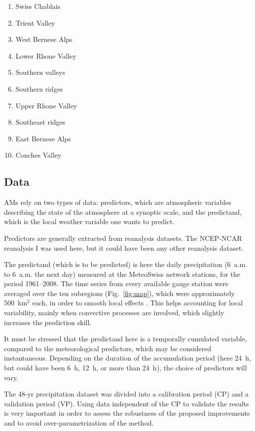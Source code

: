 \documentclass[review]{elsarticle}
\begin{document}
\begin{enumerate}
	\item Swiss Chablais
	\item Trient Valley
	\item West Bernese Alps
	\item Lower Rhone Valley
	\item Southern valleys
	\item Southern ridges
	\item Upper Rhone Valley
	\item Southeast ridges
	\item East Bernese Alps
	\item Conches Valley
\end{enumerate}


\subsection{Data}
\label{sec:data}

AMs rely on two types of data: predictors, which are atmospheric variables describing the state of the atmosphere at a synoptic scale, and the predictand, which is the local weather variable one wants to predict.

Predictors are generally extracted from reanalysis datasets. The NCEP-NCAR reanalysis I \citep[6-hourly, 17 pressure levels at a resolution of 2.5\degree, see][]{Kalnay1996} was used here, but it could have been any other reanalysis dataset.

The predictand (which is to be predicted) is here the daily precipitation (6~a.m. to 6~a.m. the next day) measured at the MeteoSwiss network stations, for the period 1961--2008. The time series from every available gauge station were averaged over the ten subregions (Fig.\ \ref{fig:map}), which were approximately 500~km$^{2}$ each, in order to smooth local effects \citep{Obled2002, Marty2012}. This helps accounting for local variability, mainly when convective processes are involved, which slightly increases the prediction skill.

It must be stressed that the predictand here is a temporally cumulated variable, compared to the meteorological predictors, which may be considered instantaneous. Depending on the duration of the accumulation period (here 24~h, but could have been 6~h, 12~h, or more than 24~h), the choice of predictors will vary. 

The 48-yr precipitation dataset was divided into a calibration period (CP) and a validation period (VP). Using data independent of the CP to validate the results is very important in order to assess the robustness of the proposed improvements and to avoid over-parametrization of the method.
\end{document}
